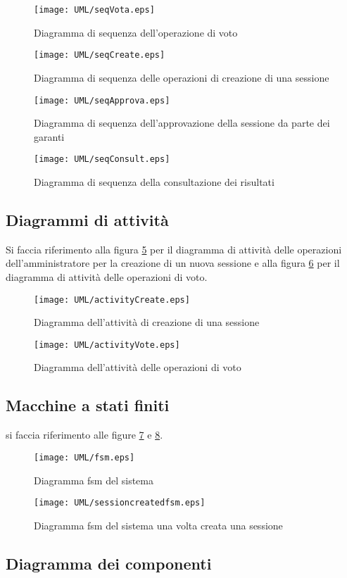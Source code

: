 \begin{figure}[ht]
	\centering
	\texttt{[image: UML/seqVota.eps]}
	\caption{Diagramma di sequenza dell'operazione di voto}
	\label{fig:seqdiagvota}
\end{figure}

\begin{figure}[ht]
	\centering
	\texttt{[image: UML/seqCreate.eps]}
	\caption{Diagramma di sequenza delle operazioni di creazione di una sessione}
	\label{fig:seqdiagcreate}
\end{figure}

\begin{figure}[ht]
	\centering
	\texttt{[image: UML/seqApprova.eps]}
	\caption{Diagramma di sequenza dell'approvazione della sessione da parte dei garanti}
	\label{fig:seqdiagapprova}
\end{figure}

\begin{figure}[ht]
	\centering
	\texttt{[image: UML/seqConsult.eps]}
	\caption{Diagramma di sequenza della consultazione dei risultati}
	\label{fig:seqdiagconsult}
\end{figure}


\subsection{Diagrammi di attività}
Si faccia riferimento alla figura \ref{fig:activitydiagcreate} per il diagramma di attività delle operazioni dell'amministratore per la creazione di un nuova sessione e alla figura \ref{fig:activitydiagvote} per il diagramma di attività delle operazioni di voto.
\begin{figure}[ht]
	\centering
	\texttt{[image: UML/activityCreate.eps]}
	\caption{Diagramma dell'attività di creazione di una sessione}
	\label{fig:activitydiagcreate}
\end{figure}


\begin{figure}[ht]
	\centering
	\texttt{[image: UML/activityVote.eps]}
	\caption{Diagramma dell'attività delle operazioni di voto}
	\label{fig:activitydiagvote}
\end{figure}

\subsection{Macchine a stati finiti}
si faccia riferimento alle figure \ref{fig:fsm} e \ref{fig:sessionCreatedFsm}.
\begin{figure}[ht]
	\centering
	\texttt{[image: UML/fsm.eps]}
	\caption{Diagramma fsm del sistema}
	\label{fig:fsm}
\end{figure}
\begin{figure}[ht]
	\centering
	\texttt{[image: UML/sessioncreatedfsm.eps]}
	\caption{Diagramma fsm del sistema una volta creata una sessione}
	\label{fig:sessionCreatedFsm}
\end{figure}


\subsection{Diagramma dei componenti}
